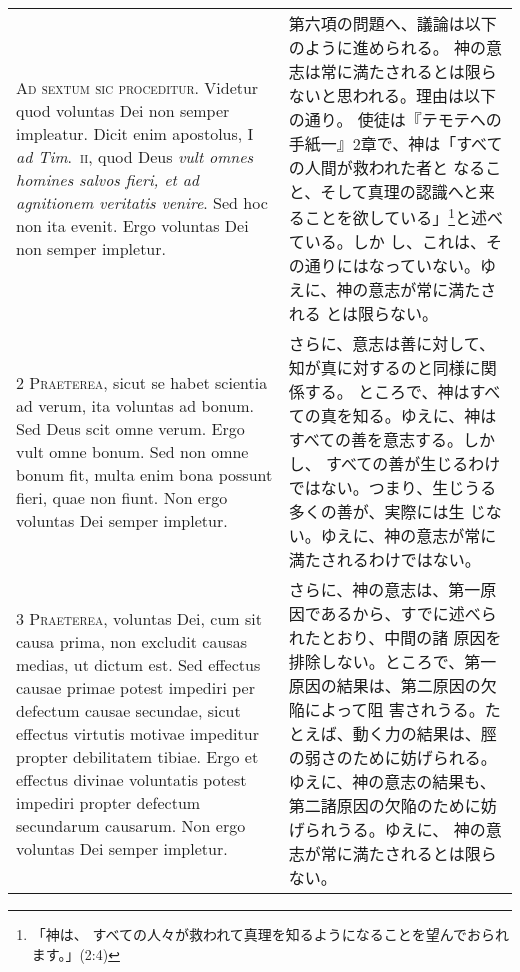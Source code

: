 \documentclass[10pt]{jsarticle} %
\begin{document}
\begin{longtable}{p{21em}p{21em}}

{\huge A}{\scshape d sextum sic proceditur}. Videtur quod
voluntas Dei non semper impleatur. Dicit enim apostolus, I {\itshape ad
 Tim}.~{\scshape ii}, quod Deus {\itshape vult omnes homines salvos fieri, et ad agnitionem veritatis
venire}. Sed hoc non ita evenit. Ergo voluntas Dei non semper impletur.

&

第六項の問題へ、議論は以下のように進められる。
神の意志は常に満たされるとは限らないと思われる。理由は以下の通り。
使徒は『テモテへの手紙一』2章で、神は「すべての人間が救われた者と
 なること、そして真理の認識へと来ることを欲している」\footnote{「神は、
 すべての人々が救われて真理を知るようになることを望んでおられます。」(2:4)}と述べている。しか
 し、これは、その通りにはなっていない。ゆえに、神の意志が常に満たされる
 とは限らない。

\\


{\scshape 2 Praeterea}, sicut se habet scientia ad
verum, ita voluntas ad bonum. Sed Deus scit omne verum. Ergo vult omne
bonum. Sed non omne bonum fit, multa enim bona possunt fieri, quae non
fiunt. Non ergo voluntas Dei semper impletur.

&

さらに、意志は善に対して、知が真に対するのと同様に関係する。
ところで、神はすべての真を知る。ゆえに、神はすべての善を意志する。しかし、
 すべての善が生じるわけではない。つまり、生じうる多くの善が、実際には生
 じない。ゆえに、神の意志が常に満たされるわけではない。


\\


{\scshape 3 Praeterea}, voluntas Dei, cum sit causa
prima, non excludit causas medias, ut dictum est. Sed effectus causae
primae potest impediri per defectum causae secundae, sicut effectus
virtutis motivae impeditur propter debilitatem tibiae. Ergo et effectus
divinae voluntatis potest impediri propter defectum secundarum
causarum. Non ergo voluntas Dei semper impletur.


&

さらに、神の意志は、第一原因であるから、すでに述べられたとおり、中間の諸
 原因を排除しない。ところで、第一原因の結果は、第二原因の欠陥によって阻
 害されうる。たとえば、動く力の結果は、脛の弱さのために妨げられる。
ゆえに、神の意志の結果も、第二諸原因の欠陥のために妨げられうる。ゆえに、
 神の意志が常に満たされるとは限らない。



\end{longtable}
\end{document}
